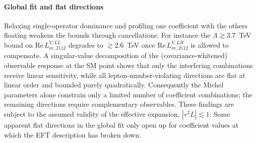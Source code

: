\paragraph{Global fit and flat directions}
Relaxing single-operator dominance and profiling one coefficient with the others floating weakens the bounds through cancellations: For instance the $\Lambda\gtrsim3.7$~TeV bound on $\text{Re}\,L^{V,LL}_{\nu e,2112}$ degrades to $\gtrsim2.6$~TeV once $\text{Re}\,L^{V,LR}_{\nu e,2112}$ is allowed to compensate. A singular-value decomposition of the (covariance-whitened) observable response at the SM point shows that only the interfering combinations receive linear sensitivity, while all lepton-number-violating directions are flat at linear order and bounded purely quadratically. Consequently the Michel parameters alone constrain only a limited number of coefficient combinations; the remaining directions require complementary observables. These findings are subject to the assumed validity of the effective expansion, $|v^2L|\lesssim1$: Some apparent flat directions in the global fit only open up for coefficient values at which the EFT description has broken down.

